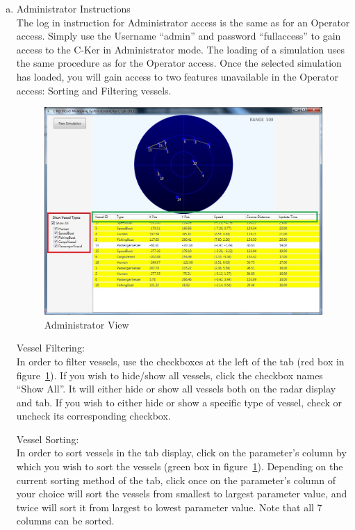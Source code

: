 \documentclass[12pt]{article}
\begin{document}
\begin{enumerate} [(a)]
\vspace*{0.2in}
\item Administrator Instructions\\
The log in instruction for Administrator access is the same as for an Operator access. Simply use the Username “admin” and password “fullaccess” to gain access to the C-Ker in Administrator mode. The loading of a simulation uses the same procedure as for the Operator access.  Once the selected simulation has loaded, you will gain access to two features unavailable in the Operator access: Sorting and Filtering vessels.
\clearpage
\begin{figure}[h!]
    \centering
    \includegraphics[scale=1]{manu4}
    \caption{Administrator View}
    \label{fig:Administrator View}
\end{figure}\par

Vessel Filtering:\\
In order to filter vessels, use the checkboxes at the left of the tab (red box in figure~\ref{fig:Administrator View}). If you wish to hide/show all vessels, click the checkbox names “Show All”. It will either hide or show all vessels both on the radar display and tab.  If you wish to either hide or show a specific type of vessel, check or uncheck its corresponding checkbox. \par

Vessel Sorting:\\
In order to sort vessels in the tab display, click on the parameter’s column by which you wish to sort the vessels (green box in figure~\ref{fig:Administrator View}). Depending on the current sorting method of the tab, click once on the parameter’s column of your choice will sort the vessels from smallest to largest parameter value, and twice will sort it from largest to lowest parameter value. Note that all 7 columns can be sorted.


\end{enumerate}
\end{document}
